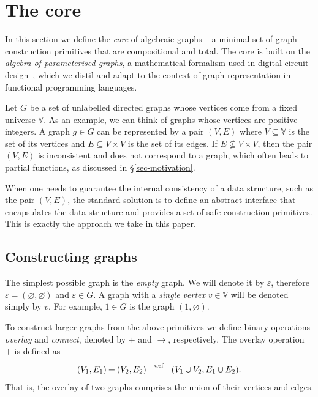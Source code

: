 \section{The core}\label{sec-core}

In this section we define the \emph{core} of algebraic graphs -- a minimal set
of graph construction primitives that are compositional and total. The core is
built on the \emph{algebra of parameterised graphs}, a mathematical formalism
used in digital circuit design~\cite{2014_algebra_mokhov},
which we distil and adapt to the context of graph representation in functional
programming languages.

Let $G$ be a set of unlabelled directed graphs whose vertices come from a fixed
universe $\mathbb{V}$. As an example, we can think of graphs whose vertices are
positive integers. A graph $g \in G$ can be represented by a pair $(V, E)$ where
$V\subseteq \mathbb{V}$ is the set of its vertices and $E \subseteq V \times V$ is
the set of its edges.
If $E \nsubseteq V \times V$, then the pair $(V, E)$ is inconsistent and does not
correspond to a graph, which often leads to partial functions, as discussed
in \S\ref{sec-motivation}.

When one needs to guarantee the internal consistency of a data structure, such
as the pair $(V, E)$, the standard solution is to define an abstract interface
that encapsulates the data structure and provides a set of safe construction
primitives. This is exactly the approach we take in this paper.

\subsection{Constructing graphs}\label{sub-constructing}

The simplest possible graph is the \emph{empty} graph. We will denote it by
$\varepsilon$, therefore $\varepsilon = (\varnothing, \varnothing)$ and
$\varepsilon \in G$. A graph with a \emph{single vertex} $v \in \mathbb{V}$
will be denoted simply by $v$. For example, $1 \in G$ is the graph
$({1}, \varnothing)$.

To construct larger graphs from the above primitives we define binary
operations \emph{overlay} and \emph{connect}, denoted by $+$ and $\rightarrow$,
respectively. The overlay operation $+$ is defined as
\[
(V_1, E_1) + (V_2, E_2)~~\stackrel{\text{def}}{=}~~(V_1 \cup V_2, E_1 \cup E_2).
\]
That is, the overlay of two graphs comprises the union of their vertices and edges.

